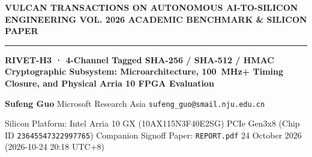 \documentclass[11pt,a4paper]{article}
\begin{document}
{\scriptsize\sffamily\textcolor{vulcan}{\textbf{VULCAN TRANSACTIONS ON AUTONOMOUS AI-TO-SILICON ENGINEERING \hfill VOL. 2026 \textperiodcentered{} ACADEMIC BENCHMARK \& SILICON PAPER}}\par}

\vspace{1pt}\textcolor{vulcan}{\rule{\textwidth}{1.2pt}}\vspace{3pt}

\begin{center}

{\sffamily\LARGE\bfseries RIVET-H3 · 4-Channel Tagged SHA-256 /\allowbreak{} SHA-512 /\allowbreak{} HMAC Cryptographic Subsystem: Microarchitecture, 100~MHz+ Timing Closure, and Physical Arria 10 FPGA Evaluation\par}\vspace{3pt}

{\small\sffamily\textbf{Sufeng Guo} \textperiodcentered{} Microsoft Research Asia \textperiodcentered{} \texttt{sufeng\_guo@smail.nju.edu.cn}\par}\vspace{1pt}

{\scriptsize\sffamily\textcolor{black!75}{Silicon Platform: Intel Arria 10 GX (\allowbreak{}10AX115N3F40E2SG)\allowbreak{} PCIe Gen3x8 (Chip ID \texttt{23645547322997765}) \textperiodcentered{} Companion Signoff Paper: \texttt{REPORT.pdf} \textperiodcentered{} 24 October 2026 (\allowbreak{}2026-10-24 20:18 UTC+\allowbreak{}8)\allowbreak{}}\par}

\end{center}\vspace{2pt}
\end{document}

